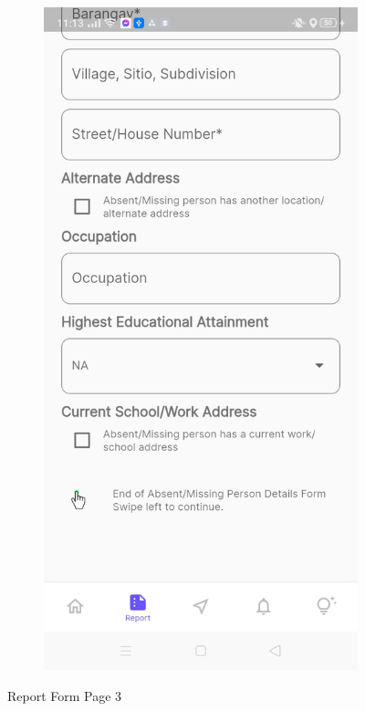\begin{figure}[!h]
\begin{subfigure}[c]{0.30\linewidth}
    \end{subfigure}
    \centering
    \begin{subfigure}[c]{0.30\linewidth}
        \centering
        \includegraphics[scale=0.15]{figures/Chapter4/Main/p3-4.jpg}
    \end{subfigure}
    \caption{Report Form Page 3}
    \label{fig:ReportPage3}
\end{figure}

